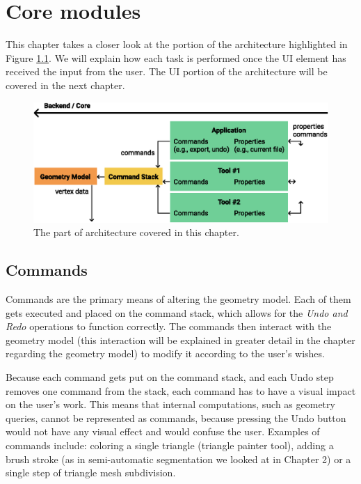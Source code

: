 \chapter{Core modules}

This chapter takes a closer look at the portion of the architecture highlighted in Figure \ref{fig:architecture_commandstack}. We will explain how each task is performed once the UI element has received the input from the user. The UI portion of the architecture will be covered in the next chapter.

\begin{figure}[h]
	\centering
	\includegraphics[scale=0.9]{images/architecture_core}
	\caption{The part of architecture covered in this chapter.}
	\label{fig:architecture_commandstack}
\end{figure}


\section{Commands}
Commands are the primary means of altering the geometry model. Each of them gets executed and placed on the command stack, which allows for the \textit{Undo and Redo} operations to function correctly. The commands then interact with the geometry model (this interaction will be explained in greater detail in the chapter regarding the geometry model) to modify it according to the user's wishes.

Because each command gets put on the command stack, and each Undo step removes one command from the stack, each command has to have a visual impact on the user's work. This means that internal computations, such as geometry queries, cannot be represented as commands, because pressing the Undo button would not have any visual effect and would confuse the user. Examples of commands include: coloring a single triangle (triangle painter tool), adding a brush stroke (as in semi-automatic segmentation we looked at in Chapter 2) or a single step of triangle mesh subdivision.

